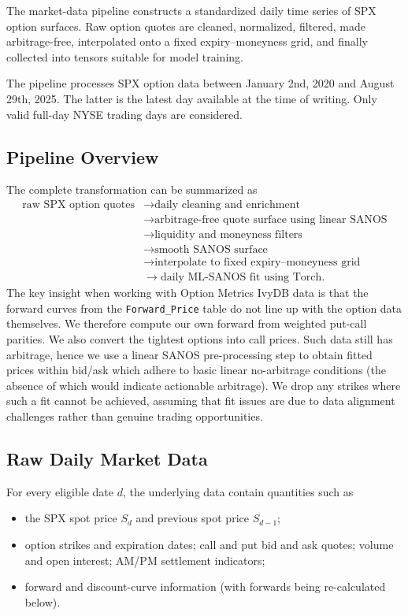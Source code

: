 \documentclass[11pt,a4paper]{article}
\begin{document}
The market-data pipeline constructs a standardized daily time series of SPX option surfaces. Raw option quotes are cleaned, normalized, filtered, made arbitrage-free, interpolated onto a fixed expiry--moneyness grid, and finally collected into tensors suitable for model training.


The pipeline processes SPX option data between January 2nd, 2020 and August 29th, 2025. The latter
is the latest day available at the time of writing. Only valid full-day NYSE trading days are considered.

\subsection{Pipeline Overview}

The complete transformation can be summarized as
%
\[
\begin{aligned}
\text{raw SPX option quotes}
&\longrightarrow \text{daily cleaning and enrichment} \\
&\longrightarrow \text{arbitrage-free quote surface using linear SANOS} \\
&\longrightarrow \text{liquidity and moneyness filters} \\
&\longrightarrow \text{smooth SANOS surface} \\
&\longrightarrow \text{interpolate to fixed expiry--moneyness grid} \\
&\longrightarrow \text{daily ML-SANOS fit using Torch}.
\end{aligned}
\]
The key insight when working with Option Metrics IvyDB data is that the forward curves
from the \texttt{Forward\_Price} table do not line up with the option data themselves. We therefore
compute our own forward from weighted put-call parities. We also convert the tightest options into call prices. Such data still has arbitrage, hence we use a linear SANOS pre-processing step to obtain fitted prices within bid/ask which adhere to basic linear no-arbitrage conditions (the absence of which would indicate actionable arbitrage). We drop any strikes where such a fit
cannot be achieved, assuming that fit issues are due to data alignment challenges rather than
genuine trading opportunities.

\subsection{Raw Daily Market Data}

For every eligible date \(d\), the underlying data contain quantities such as
%
\begin{itemize}
    \item the SPX spot price \(S_d\) and previous spot price \(S_{d-1}\);
    \item option strikes and expiration dates; call and put bid and ask quotes; volume and open interest; AM/PM settlement indicators;
    \item forward and discount-curve information (with forwards being re-calculated below).
\end{itemize}
\end{document}
